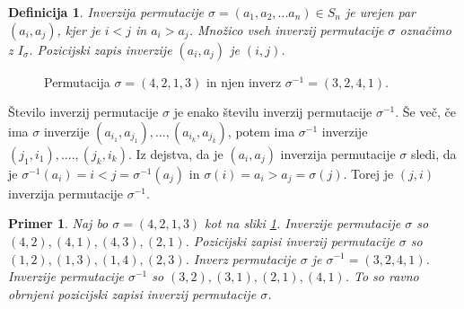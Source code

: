 \documentclass[a4paper, 12pt]{book}
\newtheorem{definicija}{Definicija}[chapter]
\newtheorem{primer}{Primer}[chapter]
\begin{document}
\begin{definicija}
    Inverzija permutacije $\sigma = (a_1, a_2,... a_n) \in S_n$ je urejen par $(a_i, a_j)$, kjer je $i < j$ in $a_i > a_j$. Množico vseh inverzij permutacije $\sigma$ označimo z $I_{\sigma}$. Pozicijski zapis inverzije $(a_i, a_j)$ je $(i, j)$.
\end{definicija}

\begin{figure}[h]
    \begin{center}
    \end{center}
    \caption{Permutacija $\sigma = (4, 2, 1, 3)$ in njen inverz $\sigma^{-1} = (3, 2, 4, 1)$.}
    \label{permutacija_4213}
\end{figure}

Število inverzij permutacije $\sigma$ je enako številu inverzij permutacije $\sigma^{-1}$. Še več, če ima $\sigma$ inverzije $(a_{i_1}, a_{j_1}), ..., (a_{i_k}, a_{j_k})$, potem ima $\sigma^{-1}$ inverzije $(j_1, i_1), ...., (j_k, i_k)$. Iz dejstva, da je $(a_i, a_j)$ inverzija permutacije $\sigma$ sledi, da je $\sigma^{-1}(a_i) = i < j = \sigma^{-1}(a_j)$ in $\sigma(i) = a_i > a_j = \sigma(j)$. Torej je $(j, i)$ inverzija permutacije $\sigma^{-1}$.

\begin{primer}
    Naj bo $\sigma = (4, 2, 1, 3)$ kot na sliki \ref{permutacija_4213}. Inverzije permutacije $\sigma$ so $(4, 2), (4, 1), (4, 3), (2, 1)$. Pozicijski zapisi inverzij permutacije $\sigma$ so $(1, 2), (1, 3), (1, 4), (2, 3)$. Inverz permutacije $\sigma$ je $\sigma^{-1} = (3, 2, 4, 1)$. Inverzije permutacije $\sigma^{-1}$ so $(3, 2), (3, 1), (2, 1), (4, 1)$. To so ravno obrnjeni pozicijski zapisi inverzij permutacije $\sigma$.
\end{primer}
\end{document}
